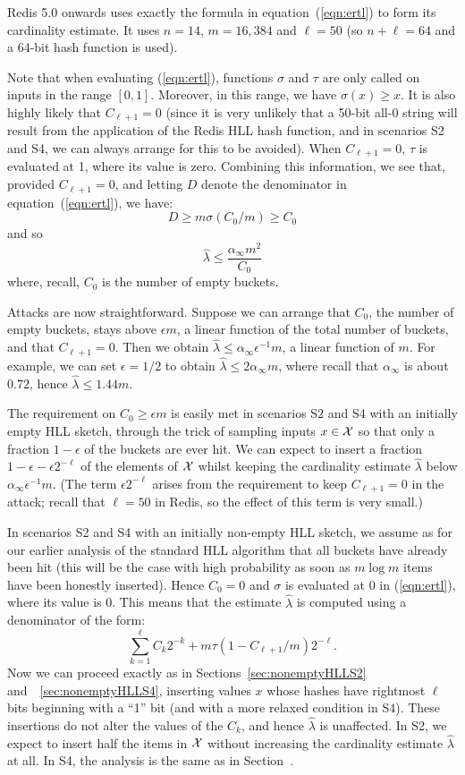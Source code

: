 \documentclass{article}
\begin{document}
Redis 5.0 onwards uses exactly the formula in equation~(\ref{eqn:ertl}) to form its cardinality estimate. It uses $n=14$, $m=16,384$ and $\ell = 50$ (so $n+\ell = 64$ and a 64-bit hash function is used). 

Note that when evaluating (\ref{eqn:ertl}), functions $\sigma$ and $\tau$ are only called on inputs in the range $[0,1]$. Moreover, in this range, we have $\sigma(x) \ge x$. It is also highly likely that $C_{\ell+1} = 0$ (since it is very unlikely that a 50-bit all-0 string will result from the application of the Redis HLL hash function, and in scenarios S2 and S4, we can always arrange for this to be avoided). When $C_{\ell+1} = 0$, $\tau$ is evaluated at 1, where its value is zero. Combining this information, we see that, provided $C_{\ell+1} = 0$, and letting $D$ denote the denominator in equation~(\ref{eqn:ertl}), we have:
\[
D \ge m\sigma(C_0/m) \ge C_0
\]
and so
\[
\hat{\lambda}  \leq \frac{\alpha_\infty m^2}{C_0}
\]
where, recall, $C_0$ is the number of empty buckets.

Attacks are now straightforward. Suppose we can arrange that $C_0$, the number of empty buckets, stays above ${\epsilon}m$, a linear function of the total number of buckets, and that $C_{\ell+1} = 0$. Then we obtain $\hat{\lambda}  \leq \alpha_\infty \epsilon^{-1} m$, a linear function of $m$. For example, we can set $\epsilon = 1/2$ to obtain $\hat{\lambda}  \leq 2\alpha_\infty m$, where recall that $\alpha_\infty$ is about $0.72$, hence $\hat{\lambda}  \leq 1.44m$.

The requirement on $C_0 \geq {\epsilon}m$ is easily met in scenarios S2 and S4 with an initially empty HLL sketch, through the trick of sampling inputs $x \in {\cal X}$ so that only a fraction $1-\epsilon$ of the buckets are ever hit. We can expect to insert a fraction $1-\epsilon-\epsilon2^{-\ell}$ of the elements of  ${\cal X}$ whilst keeping the cardinality estimate $\hat{\lambda}$ below  $\alpha_\infty \epsilon^{-1} m$. (The term $\epsilon2^{-\ell}$ arises from the requirement to keep $C_{\ell+1} =0$ in the attack; recall that $\ell=50$ in Redis, so the effect of this term is very small.) 

In scenarios S2 and S4 with an initially non-empty HLL sketch, we assume as for our earlier analysis of the standard HLL algorithm that all buckets have already been hit (this will be the case with high probability as soon as $m \log m$ items have been honestly inserted). Hence $C_0 = 0$ and $\sigma$ is evaluated at 0 in (\ref{eqn:ertl}), where its value is 0. This means that the estimate $\hat{\lambda}$ is computed using a denominator of the form:
\[
\sum_{k=1}^{\ell}C_k 2^{-k} + m \tau(1-C_{\ell+1}/m)2^{-\ell}.
\]
Now we can proceed exactly as in Sections~\ref{sec:nonemptyHLLS2} and~~\ref{sec:nonemptyHLLS4}, inserting values $x$ whose hashes have rightmost $\ell$ bits beginning with a ``1'' bit (and with a more relaxed condition in S4). These insertions do not alter the values of the $C_k$, and hence $\hat{\lambda}$ is unaffected. In S2, we expect to insert half the items in ${\cal X}$ without increasing the cardinality estimate $\hat{\lambda}$ at all. In S4, the analysis is the same as in Section~\label{sec:nonemptyHLLS4}.
\end{document}
